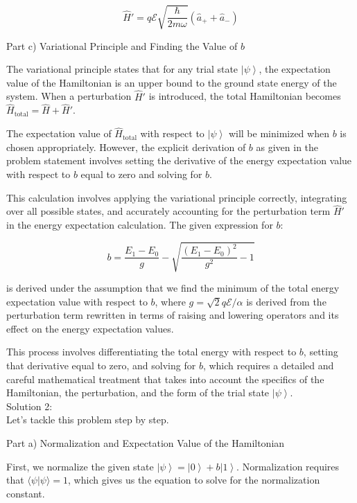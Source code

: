 \documentclass[a4paper,11pt]{article}
\begin{document}
\[ \hat{H}' = q \mathcal{E} \sqrt{\frac{\hbar}{2m\omega}}(\hat{a}_{+} + \hat{a}_{-}) \]

Part c) Variational Principle and Finding the Value of \( b \)

The variational principle states that for any trial state \( \left| \psi \right> \), the expectation value of the Hamiltonian is an upper bound to the ground state energy of the system. When a perturbation \( \hat{H}' \) is introduced, the total Hamiltonian becomes \( \hat{H}_{\text{total}} = \hat{H} + \hat{H}' \).

The expectation value of \( \hat{H}_{\text{total}} \) with respect to \( \left| \psi \right> \) will be minimized when \( b \) is chosen appropriately. However, the explicit derivation of \( b \) as given in the problem statement involves setting the derivative of the energy expectation value with respect to \( b \) equal to zero and solving for \( b \).

This calculation involves applying the variational principle correctly, integrating over all possible states, and accurately accounting for the perturbation term \( \hat{H}' \) in the energy expectation calculation. The given expression for \( b \):

\[ b = \frac{E_{1} - E_{0}}{g} - \sqrt{\frac{(E_{1} - E_{0})^{2}}{g^{2}} -1} \]

is derived under the assumption that we find the minimum of the total energy expectation value with respect to \( b \), where \( g = \sqrt{2} q \mathcal{E} / \alpha \) is derived from the perturbation term rewritten in terms of raising and lowering operators and its effect on the energy expectation values.

This process involves differentiating the total energy with respect to \( b \), setting that derivative equal to zero, and solving for \( b \), which requires a detailed and careful mathematical treatment that takes into account the specifics of the Hamiltonian, the perturbation, and the form of the trial state \( \left| \psi \right> \). \\

\noindent Solution 2: \\

Let's tackle this problem step by step.

Part a) Normalization and Expectation Value of the Hamiltonian

First, we normalize the given state \( \left| \psi \right> = \left| 0 \right> + b \left| 1 \right> \). Normalization requires that \( \langle \psi | \psi \rangle = 1 \), which gives us the equation to solve for the normalization constant.
\end{document}
